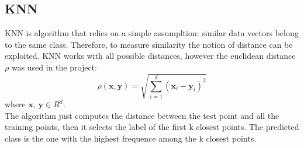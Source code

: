 \documentclass{article}
\begin{document}
\subsection{KNN}
KNN is algorithm that relies on a simple assumpltion: similar data vectors belong to the same class. Therefore, to measure similarity the notion of distance can be exploited. KNN works with all possible distances, however the euclidean distance $\rho$ was used in the project: 
\begin{equation}
\rho(\textbf{x},\textbf{y}) = \sqrt{\sum_{i=1}^d(\textbf{x}_i-\textbf{y}_i)^2}
\end{equation}
where $\textbf{x}, \, \textbf{y} \in R^d$. \\
The algorithm just computes the distance between the test point and all the training points, then it selects the label of the first k closest points. The predicted class is the one with the highest frequence among the k closest points. \\
\end{document}
